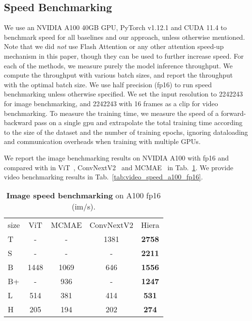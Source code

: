 \documentclass[nohyperref]{article}
\newcommand{\tablestyle}[2]{\setlength{\tabcolsep}{#1}\renewcommand{\arraystretch}{#2}\centering\footnotesize}
\newcommand{\shortname}{{Hiera}}
\theoremstyle{plain}
\theoremstyle{definition}
\theoremstyle{remark}
\begin{document}
\subsection{Speed Benchmarking}

 We use an NVIDIA A100 40GB GPU, PyTorch v1.12.1 and CUDA 11.4 to benchmark speed for all baselines and our approach, unless otherwise mentioned. Note that we did \textit{not} use Flash Attention \cite{flashattn} or any other attention speed-up mechanism in this paper, though they can be used to further increase speed. For each of the methods, we measure purely the model inference throughput. We compute the throughput with various batch sizes, and report the throughput with the optimal batch size. We use half precision (fp16) to run speed benchmarking unless otherwise specified. We set the input resolution to 2242243 for image benchmarking, and 2242243 with 16 frames as a clip for video benchmarking. To measure the training time, we measure the speed of a forward-backward pass on a single gpu and extrapolate the total training time according to the size of the dataset and the number of training epochs, ignoring dataloading and communication overheads when training with multiple GPUs.

We report the image benchmarking results on NVIDIA A100 with fp16 and compared with in ViT~\cite{vit}, ConvNextV2~\cite{woo2023convnextv2} and MCMAE~\cite{gao2022mcmae} in Tab.~\ref{tab:speed_a100_fp16}. We provide video benchmarking results in Tab.~\ref{tab:video_speed_a100_fp16}.

\begin{table}[t!]
    \centering
    \tablestyle{4pt}{1.1}
        \begin{tabular}{lcccc}
      size &  ViT & MCMAE  & ConvNextV2 & \shortname \\
      \shline
      T & - & - & 1381 & \bf 2758 \\
      S & - & - & - & \bf 2211 \\
      B & 1448 & 1069 & 646 & \bf 1556 \\
      B+& -    & 936  & -   & \bf 1247 \\
      L & 514  & 381  & 414 & \bf 531  \\
      H & 205  & 194  & 202 & \bf 274  \\
        \end{tabular}
\caption{{{\bf Image speed benchmarking} on A100 fp16 (im/s)}. }
    \label{tab:speed_a100_fp16}
\end{table}
\end{document}
